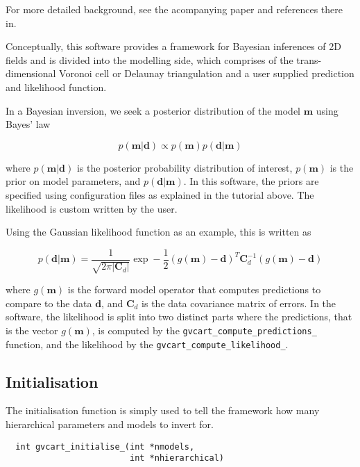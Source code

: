 \documentclass[a4paper,12pt]{article}
\begin{document}
For more detailed background, see the acompanying paper
\citet{Hawkins:2018:B} and references there in.

Conceptually, this software provides a framework for Bayesian inferences of
2D fields and is divided into the modelling side, which
comprises of the trans-dimensional Voronoi cell or Delaunay
triangulation and a user supplied prediction and likelihood function.

In a Bayesian inversion, we seek a posterior distribution of the model $\mathbf{m}$
using Bayes' law

\begin{equation}
  p(\mathbf{m}|\mathbf{d}) \propto p(\mathbf{m}) p(\mathbf{d}|\mathbf{m})
\end{equation}

where $p(\mathbf{m}|\mathbf{d})$ is the posterior probability distribution
of interest, $p(\mathbf{m})$ is the prior on model parameters, and $p(\mathbf{d}|\mathbf{m})$.
In this software, the priors are specified using configuration files as
explained in the tutorial above. The likelihood is custom written by the
user.

Using the Gaussian likelihood function as an example, this is written
as

\begin{equation}
  p(\mathbf{d}|\mathbf{m}) = \frac{1}{\sqrt{2\pi |\mathbf{C}_d|}} \exp -\frac{1}{2} (g(\mathbf{m}) - \mathbf{d})^T
  \mathbf{C}_d^{-1} (g(\mathbf{m}) - \mathbf{d})
\end{equation}

where $g(\mathbf{m})$ is the forward model operator that computes predictions to
compare to the data $\mathbf{d}$, and $\mathbf{C}_d$ is the data covariance
matrix of errors. In the software, the likelihood is split into two distinct parts
where the predictions, that is the vector $g(\mathbf{m})$, is computed by
the \texttt{gvcart\_compute\_predictions\_} function, and the likelihood by
the \texttt{gvcart\_compute\_likelihood\_}. 

\subsection{Initialisation}

The initialisation function is simply used to tell the framework how
many hierarchical parameters and models to invert for.

\begin{verbatim}
  int gvcart_initialise_(int *nmodels,
                         int *nhierarchical)
\end{verbatim}
\end{document}
